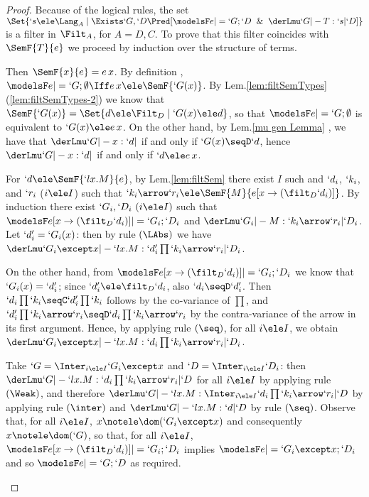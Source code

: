 \documentclass{CSML}
\begin{document}
 \begin{proof} Because of the logical rules, the set $ \Set{`s \ele \Lang_A \mid \Exists`G,`D \Pred [ \modelsF e |= `G;`D \And \derLmu `G |- T : `s | `D ] }$ is a filter in $\Filt_A$, for $A=D,C$. 
To prove that this filter coincides with $ \SemF { T}{ e }$ we proceed by induction over the structure of terms.

 \begin{description} \itemsep 2pt

 \item [$ T\equiv x $] 
Then $ \SemF { x}{ e } = e\,x$.
By definition%
, $\modelsF e |= `G;\emptyset \Iff e\,x \ele \SemF {`G(x)}$. 
By Lem.\skp\ref{lem:filtSemTypes}\,(\ref{lem:filtSemTypes-2}) we know that $ \SemF {`G(x)} = \Set{d\ele \Filt_D \mid `G(x)\ele d}$, so that $\modelsF e |= `G;\emptyset$ is equivalent to $`G(x)\ele e\,x$.
On the other hand, by Lem.\skp\ref{mu gen Lemma}%
, we have that $\derLmu `G |- x : `d | {} $ if and only if $`G(x)\seqD `d$, hence $\derLmu `G |- x : `d | {} $ if and only if $`d\ele e\,x$.
	
 \item [$ T\equiv `l x.M $] 
For $`d \ele \SemF { `l x.M}{ e }$, by Lem.\skp\ref{lem:filtSem} %
there exist $I$ such and $`d_i$, $`k_i$, and $`r_i$ ($i \ele I$) such that $`k_i\arrow `r_i \ele \SemF { M }{ e[x\to (\filt_D `d_i)] }$. 
By induction there exist $`G_i,`D _i ~ (i \ele I)$ such that $ \modelsF e[x\to (\filt_D `d_i)] |= `G_i;`D_i $ and $\derLmu `G_i |- M : `k_i\arrow `r_i | `D_i $. 
Let $`d'_i = `G_i(x)$: then by rule $(\LAbs)$ we have $\derLmu `G_i\except x |- `l x.M : `d'_i\prod `k_i\arrow `r_i | `D_i $. 

On the other hand, from $ \modelsF e[x\to (\filt_D `d_i)] |= `G_i;`D_i $ we know that $`G_i(x) = `d'_i $; since $`d'_i \ele \filt_D `d_i$, also $`d_i\seqD `d'_i$.
Then $`d_i\prod `k_i\seqC `d_i'\prod `k_i$ follows by the co-variance of $\prod $, and 
$`d'_i\prod `k_i\arrow `r_i \seqD `d_i\prod `k_i\arrow `r_i$ by the contra-variance of the arrow in its first argument. 
Hence, by applying rule $(\seq)$, for all $i \ele I$, we obtain $ \derLmu `G_i\except x |- `l x.M : `d_i\prod `k_i\arrow `r_i | `D_i $. 

Take $`G = \Inter_{i \ele I}`G_i\except x$ and $`D = \Inter_{i \ele I}`D_i$: then $ \derLmu `G |- `l x.M : `d_i\prod `k_i\arrow `r_i | `D $ for all $i \ele I$ by applying rule $(\Weak)$, and therefore $ \derLmu `G |- `l x.M : \Inter_{i \ele I}`d_i\prod `k_i\arrow `r_i | `D $ by applying rule $(\inter)$ and $ \derLmu `G |- `l x.M : `d | `D $ by rule $(\seq)$. 
Observe that, for all $i \ele I$, $x\notele \dom(`G_i\except x)$ and consequently $x\notele \dom(`G)$, so that, for all $i \ele I$, $ \modelsF e[x\to (\filt_D `d_i)] |= `G_i;`D_i $ implies $ \modelsF e |= `G_i\except x;`D_i $ and so $ \modelsF e |= `G;`D $ as required.
	

\end{description}
\end{proof}
\end{document}
